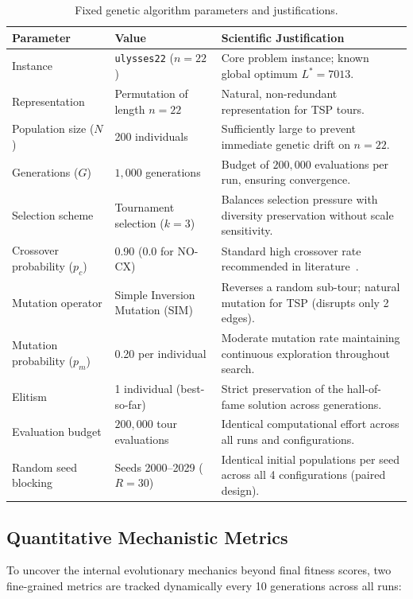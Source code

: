 \documentclass[10pt,a4paper]{article}
\begin{document}
\begin{table}[htbp]
\centering
\footnotesize
\caption{Fixed genetic algorithm parameters and justifications.}
\label{tab:params}
\begin{tabularx}{\textwidth}{ll>{\RaggedRight\arraybackslash}X}
\toprule
\textbf{Parameter} & \textbf{Value} & \textbf{Scientific Justification} \\
\midrule
Instance & \texttt{ulysses22} ($n=22$) & Core problem instance; known global optimum $L^* = 7013$. \\
Representation & Permutation of length $n=22$ & Natural, non-redundant representation for TSP tours. \\
Population size ($N$) & 200 individuals & Sufficiently large to prevent immediate genetic drift on $n=22$. \\
Generations ($G$) & $1{,}000$ generations & Budget of $200{,}000$ evaluations per run, ensuring convergence. \\
Selection scheme & Tournament selection ($k=3$) & Balances selection pressure with diversity preservation without scale sensitivity. \\
Crossover probability ($p_c$) & 0.90 (0.0 for NO-CX) & Standard high crossover rate recommended in literature~\cite{goldberg1989genetic}. \\
Mutation operator & Simple Inversion Mutation (SIM) & Reverses a random sub-tour; natural mutation for TSP (disrupts only 2 edges). \\
Mutation probability ($p_m$) & 0.20 per individual & Moderate mutation rate maintaining continuous exploration throughout search. \\
Elitism & 1 individual (best-so-far) & Strict preservation of the hall-of-fame solution across generations. \\
Evaluation budget & $200{,}000$ tour evaluations & Identical computational effort across all runs and configurations. \\
Random seed blocking & Seeds 2000--2029 ($R=30$) & Identical initial populations per seed across all 4 configurations (paired design). \\
\bottomrule
\end{tabularx}
\end{table}

\subsection{Quantitative Mechanistic Metrics}

To uncover the internal evolutionary mechanics beyond final fitness scores, two fine-grained metrics are tracked dynamically every 10 generations across all runs:
\end{document}
